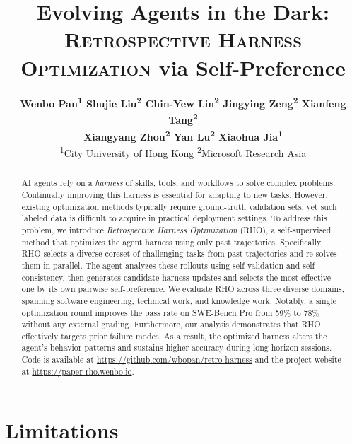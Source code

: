 \documentclass[11pt]{article}
\title{Evolving Agents in the Dark: \\ \textsc{Retrospective Harness Optimization} via Self-Preference}
\author{
  \textbf{Wenbo Pan\textsuperscript{1} \quad Shujie Liu\textsuperscript{2} \quad Chin-Yew Lin\textsuperscript{2} \quad Jingying Zeng\textsuperscript{2} \quad Xianfeng Tang\textsuperscript{2}} \\
  \textbf{Xiangyang Zhou\textsuperscript{2} \quad Yan Lu\textsuperscript{2} \quad Xiaohua Jia\textsuperscript{1}} \\[4pt]
  \textsuperscript{1}City University of Hong Kong \qquad \textsuperscript{2}Microsoft Research Asia
}
\newcommand{\method}{\textsc{RHO}}
\begin{document}
\maketitle

\begin{abstract}
AI agents rely on a \textit{harness} of skills, tools, and workflows to solve complex problems.
Continually improving this harness is essential for adapting to new tasks.
However, existing optimization methods typically require ground-truth validation sets, yet such labeled data is difficult to acquire in practical deployment settings.
To address this problem, we introduce \textit{Retrospective Harness Optimization} (\method{}), a self-supervised method that optimizes the agent harness using only past trajectories.
Specifically, \method{} selects a diverse coreset of challenging tasks from past trajectories and re-solves them in parallel.
The agent analyzes these rollouts using self-validation and self-consistency, then generates candidate harness updates and selects the most effective one by its own pairwise self-preference.
We evaluate \method{} across three diverse domains, spanning software engineering, technical work, and knowledge work.
Notably, a single optimization round improves the pass rate on SWE-Bench Pro from 59\% to 78\% without any external grading.
Furthermore, our analysis demonstrates that \method{} effectively targets prior failure modes. As a result, the optimized harness alters the agent's behavior patterns and sustains higher accuracy during long-horizon sessions.
Code is available at \url{https://github.com/wbopan/retro-harness} and the project website at \url{https://paper-rho.wenbo.io}.
\end{abstract}









\section*{Limitations}
\end{document}
